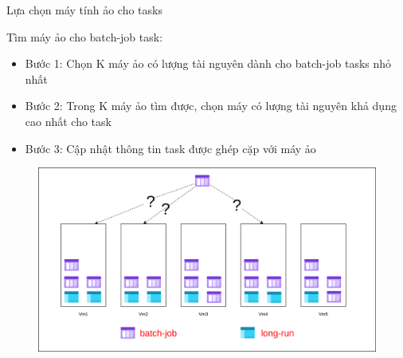\documentclass[11pt,xcolor={dvipsnames}, aspectratio=169]{beamer}
\begin{document}
\begin{frame}
{Lựa chọn máy tính ảo cho tasks}

	\begin{minipage}[t]{0.4\linewidth}
		\vspace{0.5cm}
		Tìm máy ảo cho batch-job task: 
		\begin{itemize}
			\item Bước 1: Chọn K máy ảo có lượng tài nguyên dành cho batch-job tasks nhỏ nhất 
			\item Bước 2: Trong K máy ảo tìm được, chọn máy có lượng tài nguyên khả dụng cao nhất cho task 
			\item {Bước 3}: Cập nhật thông tin task được ghép cặp với máy ảo
		\end{itemize}
	\end{minipage}
	\hfill
	\begin{minipage}[t]{0.59\linewidth}
	\begin{figure}
		\vspace{1cm}
		\includegraphics[scale=0.35]{images/balancing_tasks7.png}
	\end{figure}
	\vspace{1cm}
	\end{minipage}
\end{frame}
\end{document}
